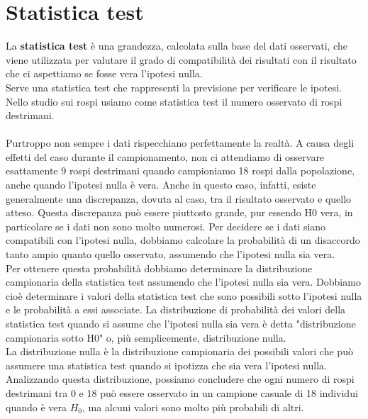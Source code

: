 \documentclass[10pt, draft]{book}
\begin{document}
\section{Statistica test}
La \textbf{statistica test} è una grandezza, calcolata sulla base del dati osservati, che viene utilizzata per valutare il grado di compatibilità dei risultati con il risultato che ci aspettiamo se fosse vera l'ipotesi nulla.
\\
Serve una statistica test che rappresenti la previsione per verificare le ipotesi.
\\
Nello studio sui rospi usiamo come statistica test il numero osservato di rospi destrimani. 
\\
\\
Purtroppo non sempre i dati rispecchiano perfettamente la realtà. A causa degli effetti del caso durante il campionamento, non ci attendiamo di osservare esattamente 9 rospi destrimani quando campioniamo 18 rospi dalla popolazione, anche quando l'ipotesi nulla è vera. Anche in questo caso, infatti, esiste generalmente una discrepanza, dovuta al caso, tra il risultato osservato e quello atteso. Questa discrepanza può essere piuttosto grande, pur essendo H0 vera, in particolare se i dati non sono molto numerosi. Per decidere se i dati siano compatibili con l'ipotesi nulla, dobbiamo calcolare la probabilità di un disaccordo tanto ampio quanto quello osservato, assumendo che l'ipotesi nulla sia vera.
\\
Per ottenere questa probabilità dobbiamo determinare la distribuzione campionaria della statistica test assumendo che l'ipotesi nulla sia vera. Dobbiamo cioè determinare i valori della statistica test che sono possibili sotto l'ipotesi nulla e le probabilità a essi associate. La distribuzione di probabilità dei valori della statistica test quando si assume che l'ipotesi nulla sia vera è detta "distribuzione campionaria sotto H0" o, più semplicemente, distribuzione nulla. 
\\
La distribuzione nulla è la distribuzione campionaria dei possibili valori che può assumere una statistica test quando si ipotizza che sia vera l'ipotesi nulla.
\\
Analizzando questa distribuzione, possiamo concludere che ogni numero di rospi destrimani tra 0 e 18 può essere osservato in un campione casuale di 18 individui quando è vera $H_0$, ma alcuni valori sono molto più probabili di altri.
\end{document}
